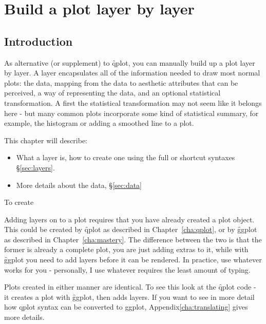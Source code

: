 


\chapter{Build a plot layer by layer}

\section{Introduction}

As alternative (or supplement) to \f{qplot}, you can manually build up a plot layer by layer.  A layer encapsulates all of the information needed to draw most normal plots:  the data, mapping from the data to aesthetic attributes that can be perceived, a way of representing the data, and an optional statistical transformation.  A first the statistical transformation may not seem like it belongs here - but many common plots incorporate some kind of statistical summary, for example, the histogram or adding a smoothed line to a plot.  

This chapter will describe:

\begin{itemize}
  \item What a layer is, how to create one using the full or shortcut syntaxes \S\ref{sec:layers}.

  \item More details about the data, \S\ref{sec:data}
\end{itemize}

To create 

Adding layers on to a plot requires that you have already created a plot object.  This could be created by \f{qplot} as described in Chapter~\ref{cha:qplot}, or by \f{ggplot} as described in Chapter~\ref{cha:mastery}.  The difference between the two is that the former is already a complete plot, you are just adding extras to it, while with \f{ggplot} you need to add layers before it can be rendered.  In practice, use whatever works for you - personally, I use whatever requires the least amount of typing.

Plots created in either manner are identical.  To see this look at the \f{qplot} code - it creates a plot with \f{ggplot}, then adds layers.  If you want to see in more detail how qplot syntax can be converted to ggplot, Appendix\ref{cha:translating} gives more details.

